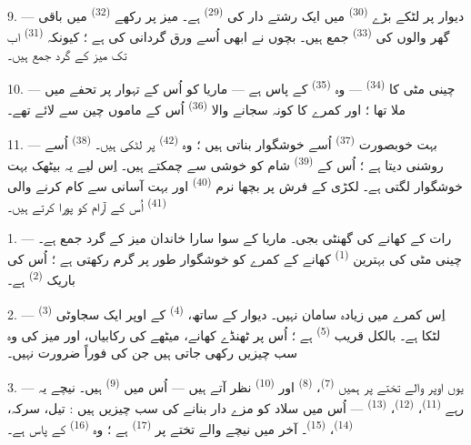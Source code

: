 9. --- دیوار پر لٹکے بڑے  \textsuperscript{(30)} میں
ایک رشتے دار کی  \textsuperscript{(29)} ہے۔ میز پر رکھے
 \textsuperscript{(32)} میں باقی گھر والوں کی
 \textsuperscript{(33)} جمع ہیں۔ بچوں نے ابھی اُسے
ورق گردانی کی ہے ؛ کیونکہ  \textsuperscript{(31)} اب
تک میز کے گرد جمع ہیں۔

10. --- چینی مٹی کا  \textsuperscript{(34)} — وہ
 \textsuperscript{(35)} کے پاس ہے — ماریا
کو اُس کے تہوار پر تحفے میں ملا تھا ؛ اور کمرے کا کونہ سجانے والا
 \textsuperscript{(36)} اُس کے ماموں چین سے لائے
تھے۔

11. --- بہت خوبصورت  \textsuperscript{(37)} اُسے
خوشگوار بناتی ہیں ؛ وہ  \textsuperscript{(42)} پر لٹکی
ہیں۔  \textsuperscript{(38)} اُسے روشنی دیتا
ہے ؛ اُس کے  \textsuperscript{(39)} شام کو
خوشی سے چمکتے ہیں۔ اِس لیے یہ بیٹھک بہت خوشگوار لگتی ہے۔ لکڑی کے
فرش پر بچھا نرم  \textsuperscript{(40)} اور بہت آسانی
سے کام کرنے والی  \textsuperscript{(41)} اُس کے
آرام کو پورا کرتے ہیں۔

\VUsaut{3.6mm}
\VUsaut{3.0mm}

1. --- رات کے کھانے کی گھنٹی بجی۔ ماریا کے سوا سارا خاندان میز کے گرد
جمع ہے۔ چینی مٹی کی بہترین  \textsuperscript{(1)}
کھانے کے کمرے کو خوشگوار طور پر گرم رکھتی ہے ؛ اُس کی باریک
 \textsuperscript{(2)} ہے۔

2. --- اِس کمرے میں زیادہ سامان نہیں۔ دیوار کے ساتھ،  \textsuperscript{(4)} کے اوپر ایک سجاوٹی 
\textsuperscript{(3)} لٹکا ہے۔ بالکل قریب 
\textsuperscript{(5)} ہے ؛ اُس پر ٹھنڈے کھانے، میٹھے کی رکابیاں، اور
میز کی وہ سب چیزیں رکھی جاتی ہیں جن کی فوراً ضرورت نہیں۔

3. --- یوں اوپر والے تختے پر ہمیں 
\textsuperscript{(7)}،  \textsuperscript{(8)} اور
 \textsuperscript{(10)} نظر آتے ہیں — اُس میں
 \textsuperscript{(9)} ہیں۔ نیچے یہ رہے 
\textsuperscript{(11)}،  \textsuperscript{(12)}،
 \textsuperscript{(13)} — اُس میں سلاد کو مزے
دار بنانے کی سب چیزیں ہیں : تیل، سرکہ، 
\textsuperscript{(14)}،  \textsuperscript{(15)}۔ آخر
میں نیچے والے تختے پر  \textsuperscript{(17)} ہے ؛ وہ
 \textsuperscript{(16)} کے پاس ہے۔

